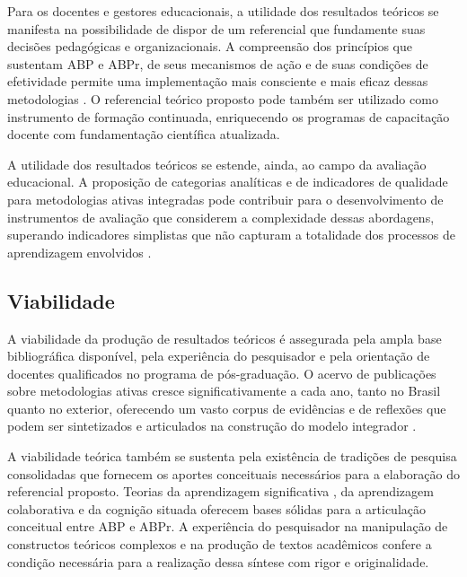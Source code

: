 Para os docentes e gestores educacionais, a utilidade dos resultados teóricos se manifesta na possibilidade de dispor de um referencial que fundamente suas decisões pedagógicas e organizacionais. A compreensão dos princípios que sustentam ABP e ABPr, de seus mecanismos de ação e de suas condições de efetividade permite uma implementação mais consciente e mais eficaz dessas metodologias \cite{MIRANDA2022}. O referencial teórico proposto pode também ser utilizado como instrumento de formação continuada, enriquecendo os programas de capacitação docente com fundamentação científica atualizada.

A utilidade dos resultados teóricos se estende, ainda, ao campo da avaliação educacional. A proposição de categorias analíticas e de indicadores de qualidade para metodologias ativas integradas pode contribuir para o desenvolvimento de instrumentos de avaliação que considerem a complexidade dessas abordagens, superando indicadores simplistas que não capturam a totalidade dos processos de aprendizagem envolvidos \cite{BLACK1998}.

\subsection{Viabilidade}
\label{subsec:jt_viabilidade}

A viabilidade da produção de resultados teóricos é assegurada pela ampla base bibliográfica disponível, pela experiência do pesquisador e pela orientação de docentes qualificados no programa de pós-graduação. O acervo de publicações sobre metodologias ativas cresce significativamente a cada ano, tanto no Brasil quanto no exterior, oferecendo um vasto corpus de evidências e de reflexões que podem ser sintetizados e articulados na construção do modelo integrador \cite{SANTOS2024}.

A viabilidade teórica também se sustenta pela existência de tradições de pesquisa consolidadas que fornecem os aportes conceituais necessários para a elaboração do referencial proposto. Teorias da aprendizagem significativa \cite{AUSUBEL2000}, da aprendizagem colaborativa e da cognição situada oferecem bases sólidas para a articulação conceitual entre ABP e ABPr. A experiência do pesquisador na manipulação de constructos teóricos complexos e na produção de textos acadêmicos confere a condição necessária para a realização dessa síntese com rigor e originalidade.

